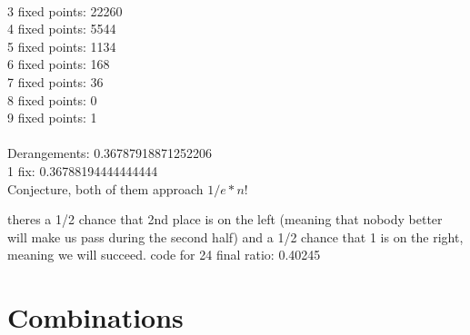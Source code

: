 \begin{oddenumerate}
		\\ 3 fixed points: 22260
		\\ 4 fixed points: 5544
		\\ 5 fixed points: 1134
		\\ 6 fixed points: 168
		\\ 7 fixed points: 36
		\\ 8 fixed points: 0
		\\ 9 fixed points: 1
		\\ 
		\\ Derangements:  0.36787918871252206
		\\ 1 fix:  0.36788194444444444
		\\ Conjecture, both of them approach $ 1/e * n!$
		\item theres a 1/2 chance that 2nd place is on the left (meaning that nobody better will make us pass during the second half) and a 1/2 chance that 1 is on the right, meaning we will succeed. 
		code for 24 final ratio:  0.40245
	\end{oddenumerate}

\section{Combinations}

